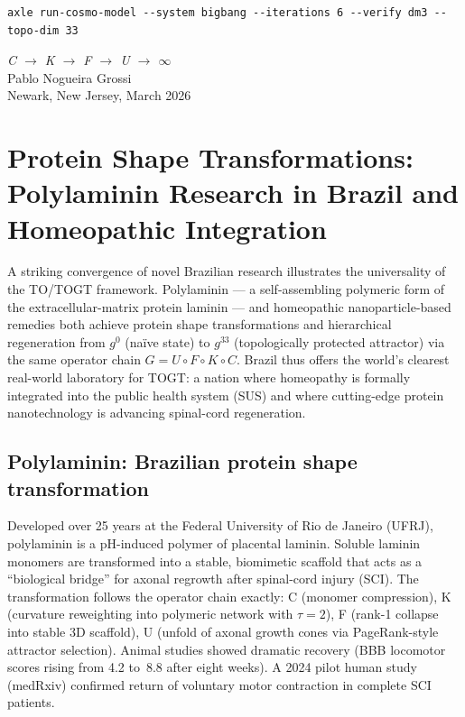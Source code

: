 \begin{verbatim}
axle run-cosmo-model --system bigbang --iterations 6 --verify dm3 --topo-dim 33
\end{verbatim}

\bigskip
\begin{flushright}
\textit{C \;$\to$\; K \;$\to$\; F \;$\to$\; U \;$\to$\; $\infty$}\\[0.3em]
Pablo Nogueira Grossi\\
Newark, New Jersey, March 2026
\end{flushright}

\chapter{Protein Shape Transformations: Polylaminin Research in Brazil and Homeopathic Integration}

A striking convergence of novel Brazilian research illustrates the universality of the TO/TOGT framework. Polylaminin --- a self-assembling polymeric form of the extracellular-matrix protein laminin --- and homeopathic nanoparticle-based remedies both achieve protein shape transformations and hierarchical regeneration from \(g^0\) (na\"ive state) to \(g^{33}\) (topologically protected attractor) via the same operator chain \(G = U \circ F \circ K \circ C\). Brazil thus offers the world's clearest real-world laboratory for TOGT: a nation where homeopathy is formally integrated into the public health system (SUS) and where cutting-edge protein nanotechnology is advancing spinal-cord regeneration.

\section{Polylaminin: Brazilian protein shape transformation}

Developed over 25 years at the Federal University of Rio de Janeiro (UFRJ), polylaminin is a pH-induced polymer of placental laminin. Soluble laminin monomers are transformed into a stable, biomimetic scaffold that acts as a ``biological bridge'' for axonal regrowth after spinal-cord injury (SCI). The transformation follows the operator chain exactly: C (monomer compression), K (curvature reweighting into polymeric network with $\tau = 2$), F (rank-1 collapse into stable 3D scaffold), U (unfold of axonal growth cones via PageRank-style attractor selection). Animal studies showed dramatic recovery (BBB locomotor scores rising from 4.2 to~8.8 after eight weeks). A 2024 pilot human study (medRxiv) confirmed return of voluntary motor contraction in complete SCI patients.

